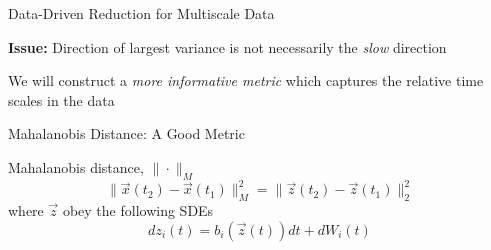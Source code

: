 \documentclass[12pt]{beamer}
\begin{document}
\begin{frame}{Data-Driven Reduction for Multiscale Data}

{\bf Issue:} Direction of largest variance is not necessarily the {\em slow} direction

\begin{center}
\end{center}

We will construct a {\em more informative metric} which captures the relative time scales in the data

\end{frame}

\begin{frame}{Mahalanobis Distance: A Good Metric}

\begin{block}{Mahalanobis distance, $\| \cdot \|_M$}
$$\| \vec{x}(t_2) - \vec{x}(t_1) \|^2_M = \| \vec{z}(t_2) - \vec{z}(t_1) \|^2_2$$
where $\vec{z}$ obey the following SDEs
$$dz_i(t) = b_i(\vec{z}(t)) dt + dW_i(t)$$
\end{block}

\end{frame}
\end{document}
